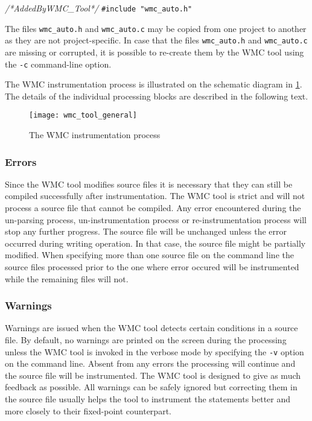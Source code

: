 {
{\em /*AddedByWMC\_Tool*/}    {\verb|#include "wmc_auto.h"|}
}

The files \verb|wmc_auto.h| and \verb|wmc_auto.c| may be copied from one project to another as they are not project-specific. In case that the files \verb|wmc_auto.h| and \verb|wmc_auto.c| are missing or corrupted, it is possible to re-create them by the WMC tool using the \verb|-c| command-line option.

The WMC instrumentation process is illustrated on the schematic diagram in \ref{fig:wmc_tool_general}. The details of the individual processing blocks are described in the following text.

\begin{figure}[!hbtp]
\begin{center}
\texttt{[image: wmc\_tool\_general]}
\end{center}
\caption{The WMC instrumentation process}
\label{fig:wmc_tool_general}
\end{figure}

\subsubsection{Errors}

Since the WMC tool modifies source files it is necessary that they can still be compiled successfully after instrumentation. The WMC tool is strict and will not process a source file that cannot be compiled. Any error encountered during the un-parsing process, un-instrumentation process or re-instrumentation process will stop any further progress. The source file will be unchanged unless the error occurred during writing operation. In that case, the source file might be partially modified. When specifying more than one source file on the command line the source files processed prior to the one where error occured will be instrumented while the remaining files will not.

\subsubsection{Warnings}

Warnings are issued when the WMC tool detects certain conditions in a source file. By default, no warnings are printed on the screen during the processing unless the WMC tool is invoked in the verbose mode by specifying the \verb|-v| option on the command line. Absent from any errors the processing will continue and the source file will be instrumented. The WMC tool is designed to give as much feedback as possible. All warnings can be safely ignored but correcting them in the source file usually helps the tool to instrument the statements better and more closely to their fixed-point counterpart.

